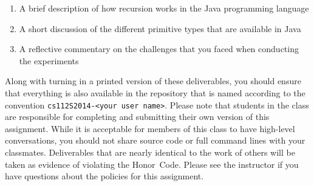   \begin{enumerate} 

  \item A brief description of how recursion works in the Java programming language

  \item A short discussion of the different primitive types that are available in Java

  \item A reflective commentary on the challenges that you faced when conducting the experiments
   
  \end{enumerate}

  Along with turning in a printed version of these deliverables, you should ensure that everything is also available in
  the repository that is named according to the convention {\tt cs112S2014-<your user name>}. Please note that students
  in the class are responsible for completing and submitting their own version of this assignment.    While it is
  acceptable for members of this class to have high-level conversations, you should not share source code or full
  command lines with your classmates.  Deliverables that are nearly identical to the work of others will be taken as
  evidence of violating the \mbox{Honor Code}.  Please see the instructor if you have questions about the policies for
  this assignment.

  
